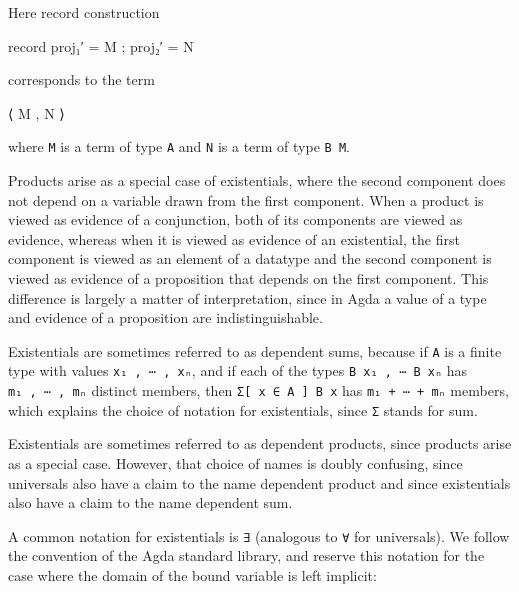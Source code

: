 Here record construction

\begin{myDisplay}
record
  { proj₁′ = M
  ; proj₂′ = N
  }
\end{myDisplay}

corresponds to the term

\begin{myDisplay}
⟨ M , N ⟩
\end{myDisplay}

where \texttt{M} is a term of type \texttt{A} and \texttt{N} is a term
of type \texttt{B\ M}.

Products arise as a special case of existentials, where the second
component does not depend on a variable drawn from the first component.
When a product is viewed as evidence of a conjunction, both of its
components are viewed as evidence, whereas when it is viewed as evidence
of an existential, the first component is viewed as an element of a
datatype and the second component is viewed as evidence of a proposition
that depends on the first component. This difference is largely a matter
of interpretation, since in Agda a value of a type and evidence of a
proposition are indistinguishable.

Existentials are sometimes referred to as dependent sums, because if
\texttt{A} is a finite type with values \texttt{x₁\ ,\ ⋯\ ,\ xₙ}, and if
each of the types \texttt{B\ x₁\ ,\ ⋯\ B\ xₙ} has
\texttt{m₁\ ,\ ⋯\ ,\ mₙ} distinct members, then
\texttt{Σ{[}\ x\ ∈\ A\ {]}\ B\ x} has \texttt{m₁\ +\ ⋯\ +\ mₙ} members,
which explains the choice of notation for existentials, since \texttt{Σ}
stands for sum.

Existentials are sometimes referred to as dependent products, since
products arise as a special case. However, that choice of names is
doubly confusing, since universals also have a claim to the name
dependent product and since existentials also have a claim to the name
dependent sum.

A common notation for existentials is \texttt{∃} (analogous to
\texttt{∀} for universals). We follow the convention of the Agda
standard library, and reserve this notation for the case where the
domain of the bound variable is left implicit:

